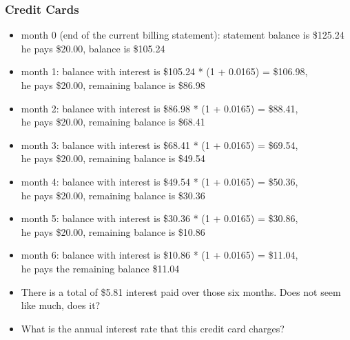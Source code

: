 \documentclass[notheorems
          ]
          {beamer}
\begin{document}
\begin{frame}
 \frametitle {  Credit Cards  }
  \footnotesize{ 
 \begin{itemize}
  \item month 0  (end of the current billing statement): 
  statement balance is \$125.24\\
  he pays \$20.00, balance is \$105.24 
  \item month 1:
   balance with interest is \$105.24 * (1 + 0.0165) = \$106.98, \\
   he pays \$20.00, remaining balance is \$86.98 
  \item month 2:
   balance with interest is \$86.98 * (1 + 0.0165) = \$88.41, \\
   he pays \$20.00, remaining balance is \$68.41 
  \item month 3: 
   balance with interest is \$68.41 * (1 + 0.0165) = \$69.54, \\
   he pays \$20.00, remaining balance is \$49.54 
  \item month 4: 
   balance with interest is \$49.54  * (1 + 0.0165) = \$50.36, \\
   he pays \$20.00, remaining balance is \$30.36 
  \item month 5: 
   balance with interest is \$30.36  * (1 + 0.0165) = \$30.86, \\
   he pays \$20.00, remaining balance is \$10.86 
  \item month 6:
   balance with interest is \$10.86  * (1 + 0.0165) = \$11.04, \\
   he pays the remaining balance \$11.04
   
  \vspace{1em}
  \item There is a total of \$5.81 interest paid over those six months. Does not seem like much, does it?
  \item What is the annual interest rate that this credit card charges? 
 \end{itemize}
  }


\end{frame}
\end{document}
